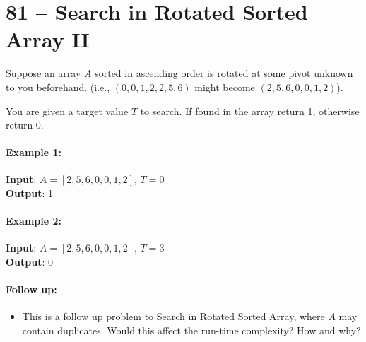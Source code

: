 \section{81 -- Search in Rotated Sorted Array II}
Suppose an array $A$ sorted in ascending order is rotated at some pivot unknown to you beforehand. (i.e., $(0,0,1,2,2,5,6)$ might become $(2,5,6,0,0,1,2)$).
\par
You are given a target value $T$ to search. If found in the array return 1, otherwise return 0.
\paragraph{Example 1:}
\begin{flushleft}
\textbf{Input}: $A = [2,5,6,0,0,1,2]$, $T = 0$
\\
\textbf{Output}: 1
\end{flushleft}
\paragraph{Example 2:}
\begin{flushleft}
\textbf{Input}: $A = [2,5,6,0,0,1,2]$, $T = 3$
\\
\textbf{Output}: 0
\end{flushleft}
\paragraph{Follow up:}
\begin{itemize}
    \item This is a follow up problem to Search in Rotated Sorted Array, where $A$ may contain duplicates. Would this affect the run-time complexity? How and why?
\end{itemize}
